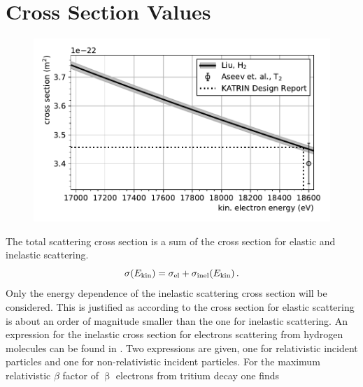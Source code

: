 \section{Cross Section Values}
\begin{figure}[t]
    \centering
    \includegraphics[width=\textwidth]{chapter/energyDependentCrossSec/fig/crossSecNoZoom.pdf}
    \label{fig:scatCrossSec}
\end{figure}
The total scattering cross section is a sum of the cross section for elastic and inelastic scattering.
\begin{equation}
    \sigma(E_\mathrm{kin}) = \sigma_\mathrm{el} + \sigma_\mathrm{inel}(E_\mathrm{kin})
    \text{\,.}
\end{equation}
Only the energy dependence of the inelastic scattering cross section will be considered. This is justified as according to \cite{Angrik:2005ep} the cross section for elastic scattering is about an order of magnitude smaller than the one for inelastic scattering. An expression for the inelastic cross section for electrons scattering from hydrogen molecules can be found in \cite{Liu1973}. Two expressions are given, one for relativistic incident particles and one for non-relativistic incident particles. For the maximum relativistic $\beta$ factor of $\upbeta$ electrons from tritium decay one finds

